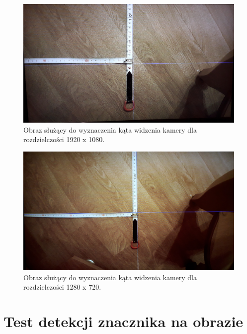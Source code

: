 \begin{figure}[h]
	\centering
	\includegraphics[width=\textwidth]{1080p.jpg}
	\caption{Obraz służący do wyznaczenia kąta widzenia kamery dla rozdzielczości 1920 x 1080.}
	\label{fig:1080p}
\end{figure}
\begin{figure}[h]
	\centering
	\includegraphics[width=\textwidth]{720p.jpg}
	\caption{Obraz służący do wyznaczenia kąta widzenia kamery dla rozdzielczości 1280 x 720.}
	\label{fig:720p}
\end{figure}


\section{Test detekcji znacznika na obrazie}
\label{sec:Test wydobycia znacznika}

